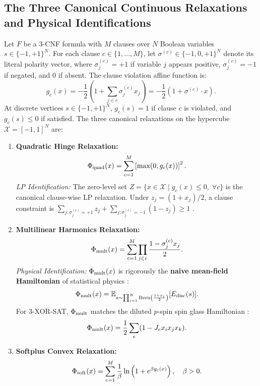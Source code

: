 \documentclass[11pt,a4paper]{article}
\begin{document}
\subsection{The Three Canonical Continuous Relaxations and Physical Identifications}
Let $F$ be a 3-CNF formula with $M$ clauses over $N$ Boolean variables $s \in \{-1, +1\}^N$. For each clause $c \in \{1, \dots, M\}$, let $\sigma^{(c)} \in \{-1, 0, +1\}^N$ denote its literal polarity vector, where $\sigma_j^{(c)} = +1$ if variable $j$ appears positive, $\sigma_j^{(c)} = -1$ if negated, and $0$ if absent. The clause violation affine function is:
\begin{equation}
g_c(x) = -\frac{1}{2}\left(1 + \sum_{j \in c} \sigma_j^{(c)} x_j\right) = -\frac{1}{2}(1 + \sigma^{(c)} \cdot x).
\end{equation}
At discrete vertices $s \in \{-1, +1\}^N$, $g_c(s) = 1$ if clause $c$ is violated, and $g_c(s) \le 0$ if satisfied.
The three canonical relaxations on the hypercube $\mathcal{X} = [-1, 1]^N$ are:
\begin{enumerate}
    \item \textbf{Quadratic Hinge Relaxation:}
    \begin{equation}
    \Phi_{\rm quad}(x) = \sum_{c=1}^M \left[\max(0, g_c(x))\right]^2.
    \end{equation}
    \textit{LP Identification:} The zero-level set $Z = \{x \in \mathcal{X} \mid g_c(x) \le 0, \; \forall c\}$ is the canonical clause-wise LP relaxation. Under $z_j=(1+x_j)/2$, a clause constraint is $\sum_{j:\sigma_j^{(c)}=+1} z_j+\sum_{j:\sigma_j^{(c)}=-1}(1-z_j)\ge1$ \cite{goemans1995improved}.
    \item \textbf{Multilinear Harmonics Relaxation:}
    \begin{equation}
    \Phi_{\rm mult}(x) = \sum_{c=1}^M \prod_{j \in c} \frac{1 - \sigma_j^{(c)} x_j}{2}.
    \end{equation}
    \textit{Physical Identification:} $\Phi_{\rm mult}(x)$ is rigorously the \textbf{naive mean-field Hamiltonian} of statistical physics \cite{thouless1977solution, calinescu2011maximizing, odonnell2014analysis}:
    \begin{equation}
    \Phi_{\rm mult}(x) = \mathbb{E}_{s \sim \prod_{i=1}^N \text{Bern}\left(\frac{1+x_i}{2}\right)} [E_{\rm disc}(s)].
    \end{equation}
    For 3-XOR-SAT, $\Phi_{\rm mult}$ matches the diluted $p$-spin spin glass Hamiltonian \cite{franz2001ferromagnet, mezard2003two, ricci2010being}:
    \begin{equation}
    \Phi_{\rm mult}(x) = \frac{1}{2}\sum_e (1 - J_e x_i x_j x_k).
    \end{equation}
    \item \textbf{Softplus Convex Relaxation:}
    \begin{equation}
    \Phi_{\rm soft}(x) = \sum_{c=1}^M \frac{1}{\beta} \ln\left(1 + e^{\beta g_c(x)}\right), \quad \beta > 0.
    \end{equation}
\end{enumerate}
\end{document}
